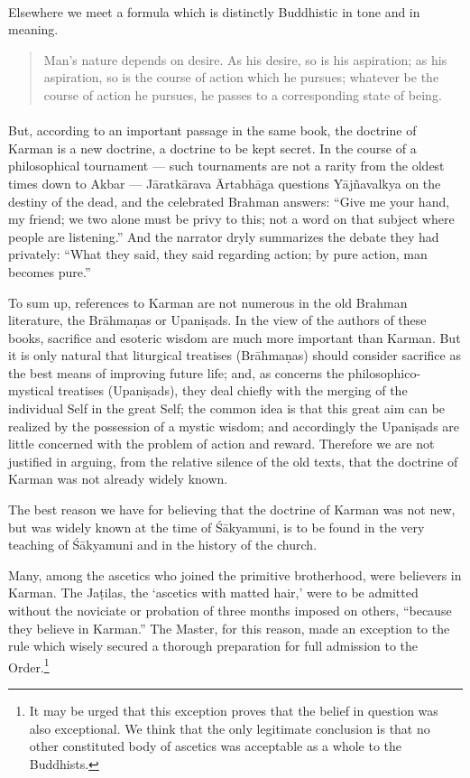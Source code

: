 \documentclass[a4paper, 11pt, oneside, english]{article}
\begin{document}
\paragraph{}
Elsewhere we meet a formula which is distinctly Buddhistic in tone and in meaning.
\begin{quotation}
\small
Man's nature depends on desire. As his desire, so is his aspiration; as his aspiration, so is the course of action which he pursues; whatever be the course of action he pursues, he passes to a corresponding state of being.
\end{quotation}
\paragraph{}
But, according to an important passage in the same book, the doctrine of Karman is a new doctrine, a doctrine to be kept secret. In the course of a philosophical tournament --- such tournaments are not a rarity from the oldest times down to Akbar --- Jāratkārava Ārtabhāga questions Yājñavalkya on the destiny of the dead, and the celebrated Brahman answers: ``Give me your hand, my friend; we two alone must be privy to this; not a word on that subject where people are listening.'' And the narrator dryly summarizes the debate they had privately: ``What they said, they said regarding action; by pure action, man becomes pure.''

To sum up, references to Karman are not numerous in the old Brahman literature, the Brāhmaṇas or Upaniṣads. In the view of the authors of these books, sacrifice and esoteric wisdom are much more important than Karman. But it is only natural that liturgical treatises (Brāhmaṇas) should consider sacrifice as the best means of improving future life; and, as concerns the philosophico-mystical treatises (Upaniṣads), they deal chiefly with the merging of the individual Self in the great Self; the common idea is that this great aim can be realized by the possession of a mystic wisdom; and accordingly the Upaniṣads are little concerned with the problem of action and reward. Therefore we are not justified in arguing, from the relative silence of the old texts, that the doctrine of Karman was not already widely known.

The best reason we have for believing that the doctrine of Karman was not new, but was widely known at the time of Śākyamuni, is to be found in the very teaching of Śākyamuni and in the history of the church.

Many, among the ascetics who joined the primitive brotherhood, were believers in Karman. The Jaṭilas, the `ascetics with matted hair,' were to be admitted without the noviciate or probation of three months imposed on others, ``because they believe in Karman.'' The Master, for this reason, made an exception to the rule which wisely secured a thorough preparation for full admission to the Order.\footnote{It may be urged that this exception proves that the belief in question was also exceptional. We think that the only legitimate conclusion is that no other constituted body of ascetics was acceptable as a whole to the Buddhists.}
\end{document}
